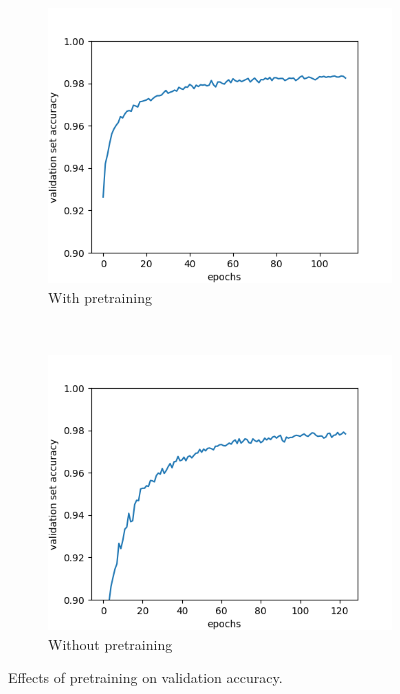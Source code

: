 \documentclass{article}
\begin{document}
	\begin{figure}[h!]
		\centering
		\begin{subfigure}[b]{0.4\textwidth}
			\includegraphics[width=\textwidth]{images/pretrain.png}
			\caption{With pretraining}
			\label{fig:pretrain}
		\end{subfigure}
		~
		\begin{subfigure}[b]{0.4\textwidth}
			\includegraphics[width=\textwidth]{images/no_pretrain.png}
			\caption{Without pretraining}
			\label{fig:no_pretrain}
		\end{subfigure}
		\caption{Effects of pretraining on validation accuracy.}
		\label{fig:pretrain_comp}
	\end{figure}
\end{document}
